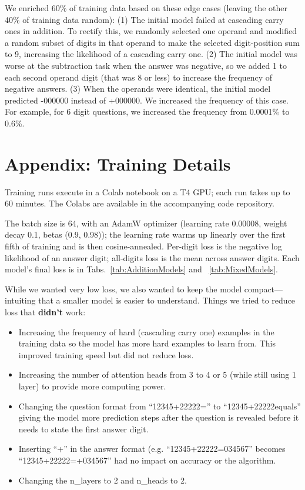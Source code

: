 \documentclass[11pt]{article}
\begin{document}
We enriched 60\% of training data based on these edge cases (leaving the other 40\% of training data random):
(1) The initial model failed at cascading carry ones in addition. To rectify this, we randomly selected one operand and modified a random subset of digits in that operand to make the selected digit-position sum to 9, increasing the likelihood of a cascading carry one. 
(2) The initial model was worse at the subtraction task when the answer was negative, so we added 1 to each second operand digit (that was 8 or less) to increase the frequency of negative answers. 
(3) When the operands were identical, the initial model predicted -000000 instead of +000000. We increased the frequency of this case. For example, for 6 digit questions, we increased the frequency from 0.0001\% to 0.6\%.

\section{Appendix: Training Details}
\label{app:ModelShape}
\label{app:ModelLoss}

Training runs execute in a Colab notebook on a T4 GPU; each run takes up to 60 minutes.
The Colabs are available in the accompanying code repository.

The batch size is 64, with an AdamW optimizer (learning rate 0.00008, weight decay 0.1, betas (0.9, 0.98)); the learning rate warms up linearly over the first fifth of training and is then cosine-annealed. Per-digit loss is the negative log likelihood of an answer digit; all-digits loss is the mean across answer digits. Each model's final loss is in Tabs.~\ref{tab:AdditionModels} and ~\ref{tab:MixedModels}.

While we wanted very low loss, we also wanted to keep the model compact---intuiting that a smaller model is easier to understand. Things we tried to reduce loss that \textbf{didn't} work:

\begin{itemize}
\item Increasing the frequency of hard (cascading carry one) examples in the training data so the model has more hard examples to learn from. This improved training speed but did not reduce loss.
\item Increasing the number of attention heads from 3 to 4 or 5 (while still using 1 layer) to provide more computing power.
\item Changing the question format from “12345+22222=” to “12345+22222equals” giving the model more prediction steps after the question is revealed before it needs to state the first answer digit.
\item Inserting “+” in the answer format (e.g. “12345+22222=034567” becomes “12345+22222=+034567” had no impact on accuracy or the algorithm.
\item Changing the n\_layers to 2 and n\_heads to 2.
\end{itemize}
\end{document}

